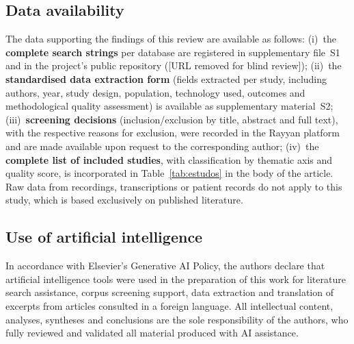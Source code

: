 \documentclass[review,12pt]{elsarticle}
\begin{document}
\subsection*{Data availability}
The data supporting the findings of this review are available as follows:
(i)~the \textbf{complete search strings} per database are registered in
supplementary file~S1 and in the project's public repository
([URL removed for blind review]);
(ii)~the \textbf{standardised data extraction form} (fields extracted per
study, including authors, year, study design, population, technology used,
outcomes and methodological quality assessment) is available as supplementary
material~S2;
(iii)~\textbf{screening decisions} (inclusion/exclusion by title, abstract
and full text), with the respective reasons for exclusion, were recorded in
the Rayyan platform \citep{Ouzzani2016} and are made available upon request
to the corresponding author;
(iv)~the \textbf{complete list of included studies}, with classification by
thematic axis and quality score, is incorporated in Table~\ref{tab:estudos}
in the body of the article.
Raw data from recordings, transcriptions or patient records do not apply to
this study, which is based exclusively on published literature.

\subsection*{Use of artificial intelligence}
In accordance with Elsevier's Generative AI Policy, the authors declare that
artificial intelligence tools were used in the preparation of this work for
literature search assistance, corpus screening support, data extraction and
translation of excerpts from articles consulted in a foreign language.
All intellectual content, analyses, syntheses and conclusions are the sole
responsibility of the authors, who fully reviewed and validated all material
produced with AI assistance.



\end{document}
